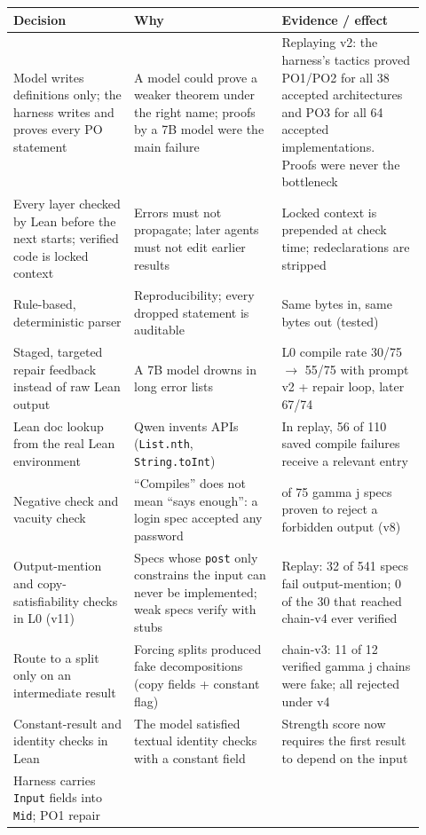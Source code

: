 \documentclass[11pt,a4paper]{article}
\newcommand{\code}[1]{\texttt{#1}}
\begin{document}
\small
\begin{longtable}{>{\raggedright\arraybackslash}p{0.27\linewidth} >{\raggedright\arraybackslash}p{0.33\linewidth} >{\raggedright\arraybackslash}p{0.32\linewidth}}
\toprule
Decision & Why & Evidence / effect \\
\midrule
\endhead
Model writes definitions only; the harness writes and proves every PO statement &
A model could prove a weaker theorem under the right name; proofs by a 7B model were the main failure &
Replaying v2: the harness's tactics proved PO1/PO2 for all 38 accepted architectures and PO3 for all 64 accepted implementations. Proofs were never the bottleneck \\
Every layer checked by Lean before the next starts; verified code is locked context &
Errors must not propagate; later agents must not edit earlier results &
Locked context is prepended at check time; redeclarations are stripped \\
Rule-based, deterministic parser &
Reproducibility; every dropped statement is auditable &
Same bytes in, same bytes out (tested) \\
Staged, targeted repair feedback instead of raw Lean output &
A 7B model drowns in long error lists &
L0 compile rate 30/75 $\to$ 55/75 with prompt v2 + repair loop, later 67/74 \\
Lean doc lookup from the real Lean environment &
Qwen invents APIs (\code{List.nth}, \code{String.toInt}) &
In replay, 56 of 110 saved compile failures receive a relevant entry \\
Negative check and vacuity check &
``Compiles'' does not mean ``says enough'': a login spec accepted any password &
47 of 75 gamma j specs proven to reject a forbidden output (v8) \\
Output-mention and copy-satisfiability checks in L0 (v11) &
Specs whose \code{post} only constrains the input can never be implemented; weak specs verify with stubs &
Replay: 32 of 541 specs fail output-mention; 0 of the 30 that reached chain-v4 ever verified \\
Route to a split only on an intermediate result &
Forcing splits produced fake decompositions (copy fields + constant flag) &
chain-v3: 11 of 12 verified gamma j chains were fake; all rejected under v4 \\
Constant-result and identity checks in Lean &
The model satisfied textual identity checks with a constant field &
Strength score now requires the first result to depend on the input \\
Harness carries \code{Input} fields into \code{Mid}; PO1 repair &

\end{longtable}
\end{document}
